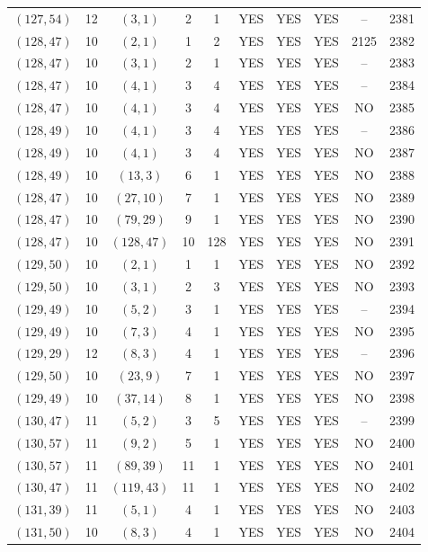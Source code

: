 \begin{longtable}{|c|c|c|c|c|c|c|c|c|c|}
$(127, 54)$ & 12 & $(3, 1)$ & 2 & 1 & YES & YES & YES & -- & 2381\\
$(128, 47)$ & 10 & $(2, 1)$ & 1 & 2 & YES & YES & YES & 2125 & 2382\\
$(128, 47)$ & 10 & $(3, 1)$ & 2 & 1 & YES & YES & YES & -- & 2383\\
$(128, 47)$ & 10 & $(4, 1)$ & 3 & 4 & YES & YES & YES & -- & 2384\\
$(128, 47)$ & 10 & $(4, 1)$ & 3 & 4 & YES & YES & YES & NO & 2385\\
$(128, 49)$ & 10 & $(4, 1)$ & 3 & 4 & YES & YES & YES & -- & 2386\\
$(128, 49)$ & 10 & $(4, 1)$ & 3 & 4 & YES & YES & YES & NO & 2387\\
$(128, 49)$ & 10 & $(13, 3)$ & 6 & 1 & YES & YES & YES & NO & 2388\\
$(128, 47)$ & 10 & $(27, 10)$ & 7 & 1 & YES & YES & YES & NO & 2389\\
$(128, 47)$ & 10 & $(79, 29)$ & 9 & 1 & YES & YES & YES & NO & 2390\\
$(128, 47)$ & 10 & $(128, 47)$ & 10 & 128 & YES & YES & YES & NO & 2391\\
$(129, 50)$ & 10 & $(2, 1)$ & 1 & 1 & YES & YES & YES & NO & 2392\\
$(129, 50)$ & 10 & $(3, 1)$ & 2 & 3 & YES & YES & YES & NO & 2393\\
$(129, 49)$ & 10 & $(5, 2)$ & 3 & 1 & YES & YES & YES & -- & 2394\\
$(129, 49)$ & 10 & $(7, 3)$ & 4 & 1 & YES & YES & YES & NO & 2395\\
$(129, 29)$ & 12 & $(8, 3)$ & 4 & 1 & YES & YES & YES & -- & 2396\\
$(129, 50)$ & 10 & $(23, 9)$ & 7 & 1 & YES & YES & YES & NO & 2397\\
$(129, 49)$ & 10 & $(37, 14)$ & 8 & 1 & YES & YES & YES & NO & 2398\\
$(130, 47)$ & 11 & $(5, 2)$ & 3 & 5 & YES & YES & YES & -- & 2399\\
$(130, 57)$ & 11 & $(9, 2)$ & 5 & 1 & YES & YES & YES & NO & 2400\\
$(130, 57)$ & 11 & $(89, 39)$ & 11 & 1 & YES & YES & YES & NO & 2401\\
$(130, 47)$ & 11 & $(119, 43)$ & 11 & 1 & YES & YES & YES & NO & 2402\\
$(131, 39)$ & 11 & $(5, 1)$ & 4 & 1 & YES & YES & YES & NO & 2403\\
$(131, 50)$ & 10 & $(8, 3)$ & 4 & 1 & YES & YES & YES & NO & 2404\\

\end{longtable}
